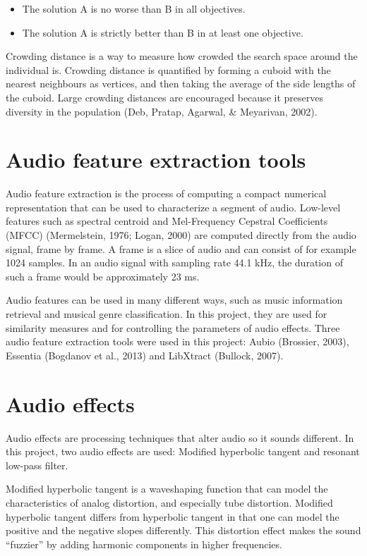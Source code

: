 \begin{itemize}  
\item The solution A is no worse than B in all objectives.
\item The solution A is strictly better than B in at least one objective.
\end{itemize}

Crowding distance is a way to measure how crowded the search space around the individual is. Crowding distance is quantified by forming a cuboid with the nearest neighbours as vertices, and then taking the average of the side lengths of the cuboid. Large crowding distances are encouraged because it preserves diversity in the population (Deb, Pratap, Agarwal, \& Meyarivan, 2002).

\section{Audio feature extraction tools}
Audio feature extraction is the process of computing a compact numerical representation that can be used to characterize a segment of audio. Low-level features such as spectral centroid and Mel-Frequency Cepstral Coefficients (MFCC) (Mermelstein, 1976; Logan, 2000) are computed directly from the audio signal, frame by frame. A frame is a slice of audio and can consist of for example 1024 samples. In an audio signal with sampling rate 44.1 kHz, the duration of such a frame would be approximately 23 ms.

Audio features can be used in many different ways, such as music information retrieval and musical genre classification. In this project, they are used for similarity measures and for controlling the parameters of audio effects. Three audio feature extraction tools were used in this project: Aubio (Brossier, 2003), Essentia (Bogdanov et al., 2013) and LibXtract (Bullock, 2007).

\section{Audio effects}
Audio effects are processing techniques that alter audio so it sounds different. In this project, two audio effects are used: Modified hyperbolic tangent and resonant low-pass filter.

Modified hyperbolic tangent is a waveshaping function that can model the characteristics of analog distortion, and especially tube distortion. Modified hyperbolic tangent differs from hyperbolic tangent in that one can model the positive and the negative slopes differently. This distortion effect makes the sound “fuzzier” by adding harmonic components in higher frequencies.

